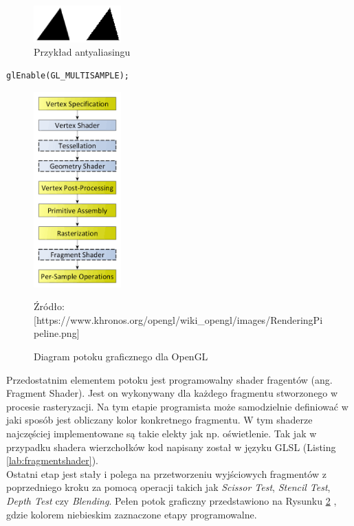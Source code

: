 \documentclass[archive]{mgr}
\begin{document}
\begin{figure}[h!]
  \centering
    \includegraphics[width=0.30\textwidth]{images/antyaliasing.png}
   \caption{Przykład antyaliasingu}
   \label{lab:antyaliasing}
\end{figure}

\begin{lstlisting}[caption={Włączenie antyaliasingu OpenGL},captionpos=b,label={lab:multisample}]
glEnable(GL_MULTISAMPLE);  
\end{lstlisting}

\begin{figure}[h!]
  \centering
    \includegraphics[width=0.30\textwidth]{images/RenderingPipeline.png}
   \caption{Diagram potoku graficznego dla OpenGL}
   Źródło: [https://www.khronos.org/opengl/wiki\_opengl/images/RenderingPipeline.png]
   \label{lab:pipeline}
\end{figure}
\newpage
Przedostatnim elementem potoku jest programowalny shader fragentów (ang. Fragment Shader). Jest on wykonywany dla każdego fragmentu stworzonego w procesie rasteryzacji. Na tym etapie programista może samodzielnie definiować w jaki sposób jest obliczany kolor konkretnego fragmentu. W tym shaderze najczęściej implementowane są takie elekty jak np. oświetlenie. Tak jak w przypadku shadera wierzchołków kod napisany został w języku GLSL (Listing \ref{lab:fragmentshader}).\\

Ostatni etap jest stały i polega na przetworzeniu wyjściowych fragmentów z poprzedniego kroku za pomocą operacji takich jak \emph{Scissor Test}, \emph{Stencil Test}, \emph{Depth Test} czy  \emph{Blending}. Pełen potok graficzny przedstawiono na Rysunku \ref{lab:pipeline}    \cite{Rendering_Pipeline_Overview}, gdzie kolorem niebieskim zaznaczone etapy programowalne.
\end{document}
